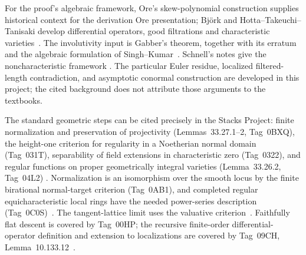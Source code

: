 For the proof's algebraic framework, Ore's skew-polynomial construction
\cite{Ore1933} supplies historical context for the derivation Ore presentation;
Bj\"ork and Hotta--Takeuchi--Tanisaki develop differential operators, good
filtrations and characteristic varieties~\cite{Bjork,HTT}. The involutivity
input is Gabber's theorem, together with its erratum and the algebraic
formulation of Singh--Kumar~\cite{Gabber1981,Gabber1982,SinghKumar2014}.
Schnell's notes give the noncharacteristic framework
\cite[Lecture~15]{SchnellNotes}. The particular Euler residue, localized
filtered-length contradiction, and asymptotic conormal construction are
developed in this project; the cited background does not attribute those
arguments to the textbooks.

The standard geometric steps can be cited precisely in the Stacks Project:
finite normalization and preservation of projectivity (Lemmas~33.27.1--2,
Tag~0BXQ), the height-one criterion for regularity in a Noetherian normal
domain (Tag~031T), separability of field extensions in characteristic zero
(Tag~0322), and regular functions on proper
geometrically integral varieties (Lemma~33.26.2, Tag~04L2)
\cite[Tags~0BXQ, 031T, 0322, 04L2]{Stacks}.
Normalization is an isomorphism over the smooth locus by the finite
birational normal-target criterion (Tag~0AB1), and completed regular
equicharacteristic local rings have the needed power-series description
(Tag~0C0S)~\cite[Tags~0AB1, 0C0S]{Stacks}. The tangent-lattice limit uses
the valuative criterion~\cite[Chapter~II, Section~4]{hartshorne}.
Faithfully flat descent is covered by Tag~00HP; the recursive finite-order
differential-operator definition and extension to localizations are covered
by Tag~09CH, Lemma~10.133.12~\cite[Tags~00HP, 09CH]{Stacks}.

